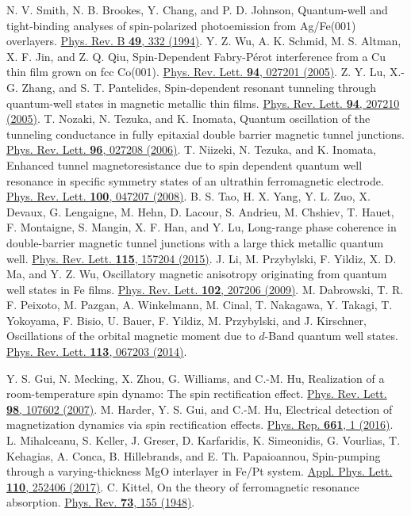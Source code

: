 \documentclass[prl,aps,twocolumn,showpacs,citeautoscript,reprint,superscriptaddress]{revtex4-1}
\newcommand{\DOI}[1]{\href{https://doi.org/#1}}
\begin{document}
\begin{thebibliography}{00}
N. V. Smith, N. B. Brookes, Y. Chang, and P. D. Johnson, Quantum-well and tight-binding analyses of spin-polarized photoemission from Ag/Fe(001) overlayers. \DOI{10.1103/PhysRevB.49.332}{Phys. Rev. B {\bf 49}, 332 (1994)}.
Y. Z. Wu, A. K. Schmid, M. S. Altman, X. F. Jin, and Z. Q. Qiu, Spin-Dependent Fabry-P{\'e}rot interference from a Cu thin film grown on fcc Co(001). \DOI{10.1103/PhysRevLett.94.027201}{Phys. Rev. Lett. {\bf 94}, 027201 (2005)}.
Z. Y. Lu, X.-G. Zhang, and S. T. Pantelides, Spin-dependent resonant tunneling through quantum-well states in magnetic metallic thin films. \DOI{10.1103/PhysRevLett.94.207210}{Phys. Rev. Lett. {\bf 94}, 207210 (2005)}.
T. Nozaki, N. Tezuka, and K. Inomata, Quantum oscillation of the tunneling conductance in fully epitaxial double barrier magnetic tunnel junctions. \DOI{10.1103/PhysRevLett.96.027208}{Phys. Rev. Lett. {\bf 96}, 027208 (2006)}.
T. Niizeki, N. Tezuka, and K. Inomata, Enhanced tunnel magnetoresistance due to spin dependent quantum well resonance in specific symmetry states of an ultrathin ferromagnetic electrode. \DOI{10.1103/PhysRevLett.100.047207}{Phys. Rev. Lett. {\bf 100}, 047207 (2008)}.
B. S. Tao, H. X. Yang, Y. L. Zuo, X. Devaux, G. Lengaigne, M. Hehn, D. Lacour, S. Andrieu, M. Chshiev, T. Hauet, F. Montaigne, S. Mangin, X. F. Han, and Y. Lu, Long-range phase coherence in double-barrier magnetic tunnel junctions with a large thick metallic quantum well. \DOI{10.1103/PhysRevLett.115.157204}{Phys. Rev. Lett. {\bf 115}, 157204 (2015)}.
J. Li, M. Przybylski, F. Yildiz, X. D. Ma, and Y. Z. Wu, Oscillatory magnetic anisotropy originating from quantum well states in Fe films. \DOI{10.1103/PhysRevLett.102.207206}{Phys. Rev. Lett. {\bf 102}, 207206 (2009)}.
M. Dabrowski, T. R. F. Peixoto, M. Pazgan, A. Winkelmann, M. Cinal, T. Nakagawa, Y. Takagi, T. Yokoyama, F. Bisio, U. Bauer, F. Yildiz, M. Przybylski, and J. Kirschner, Oscillations of the orbital magnetic moment due to $d$-Band quantum well states. \DOI{10.1103/PhysRevLett.113.067203}{Phys. Rev. Lett. {\bf 113}, 067203 (2014)}.

Y. S. Gui, N. Mecking, X. Zhou, G. Williams, and C.-M. Hu, Realization of a room-temperature spin dynamo: The spin rectification effect. \DOI{10.1103/PhysRevLett.98.107602}{Phys. Rev. Lett. {\bf 98}, 107602 (2007)}.
M. Harder, Y. S. Gui, and C.-M. Hu, Electrical detection of magnetization dynamics via spin rectification effects. \DOI{10.1016/j.physrep.2016.10.002}{Phys. Rep. {\bf 661}, 1 (2016)}.
L. Mihalceanu, S. Keller, J. Greser, D. Karfaridis, K. Simeonidis, G. Vourlias, T. Kehagias, A. Conca, B. Hillebrands, and E. Th. Papaioannou, Spin-pumping through a varying-thickness MgO interlayer in Fe/Pt system. \DOI{10.1063/1.4989678}{Appl. Phys. Lett. {\bf 110}, 252406 (2017)}.
C. Kittel, On the theory of ferromagnetic resonance absorption. \DOI{10.1103/PhysRev.73.155}{Phys. Rev. {\bf 73}, 155 (1948)}.


\end{thebibliography}
\end{document}
